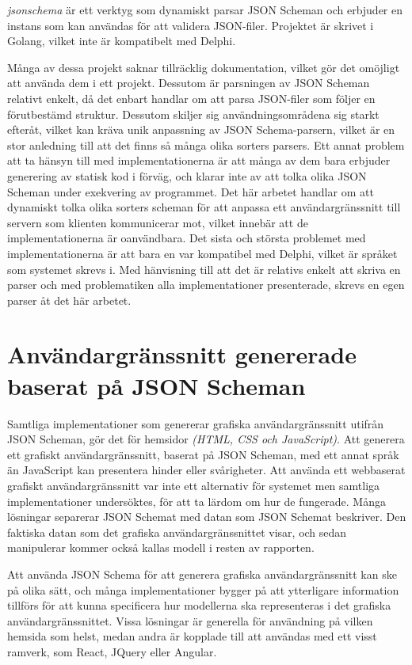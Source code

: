 \textit{jsonschema} är ett verktyg som dynamiskt parsar JSON Scheman och erbjuder en instans som kan användas för att validera JSON-filer. Projektet är skrivet i Golang, vilket inte är kompatibelt med Delphi. \cite{Qriinc.}

Många av dessa projekt saknar tillräcklig dokumentation, vilket gör det omöjligt att använda dem i ett projekt. Dessutom är parsningen av JSON Scheman relativt enkelt, då det enbart handlar om att parsa JSON-filer som följer en förutbestämd struktur. Dessutom skiljer sig användningsområdena sig starkt efteråt, vilket kan kräva unik anpassning av JSON Schema-parsern, vilket är en stor anledning till att det finns så många olika sorters parsers. Ett annat problem att ta hänsyn till med implementationerna är att många av dem bara erbjuder generering av statisk kod i förväg, och klarar inte av att tolka olika JSON Scheman under exekvering av programmet. Det här arbetet handlar om att dynamiskt tolka olika sorters scheman för att anpassa ett användargränssnitt till servern som klienten kommunicerar mot, vilket innebär att de implementationerna är oanvändbara. Det sista och största problemet med implementationerna är att bara en var kompatibel med Delphi, vilket är språket som systemet skrevs i. Med hänvisning till att det är relativs enkelt att skriva en parser och med problematiken alla implementationer presenterade, skrevs en egen parser åt det här arbetet.

\section{Användargränssnitt genererade baserat på JSON Scheman}
\label{sec:forarbete:gui-generering}
Samtliga implementationer som genererar grafiska användargränssnitt utifrån JSON Scheman, gör det för hemsidor \textit{(HTML, CSS och JavaScript)}. Att generera ett grafiskt användargränssnitt, baserat på JSON Scheman, med ett annat språk än JavaScript kan presentera hinder eller svårigheter. Att använda ett webbaserat grafiskt användargränssnitt var inte ett alternativ för systemet men samtliga implementationer undersöktes, för att ta lärdom om hur de fungerade. Många lösningar separerar JSON Schemat med datan som JSON Schemat beskriver. Den faktiska datan som det grafiska användargränssnittet visar, och sedan manipulerar kommer också kallas modell i resten av rapporten.

Att använda JSON Schema för att generera grafiska användargränssnitt kan ske på olika sätt, och många implementationer bygger på att ytterligare information tillförs för att kunna specificera hur modellerna ska representeras i det grafiska användargränssnittet. Vissa lösningar är generella för användning på vilken hemsida som helst, medan andra är kopplade till att användas med ett visst ramverk, som React, JQuery eller Angular.

